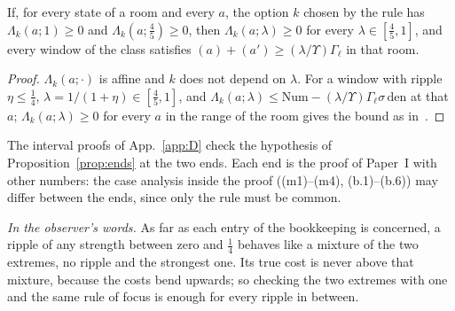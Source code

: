 \begin{proposition} \proofst
\label{prop:ends}
If, for every state of a room and every $a$, the option $k$ chosen by the rule has $\Lambda_k(a;1)\ge0$ and $\Lambda_k(a;\tfrac45)\ge0$, then $\Lambda_k(a;\lambda)\ge0$ for every $\lambda\in[\tfrac45,1]$, and every window of the class satisfies $(a)+(a')\ge(\lambda/\Upsilon)\Gamma_\ell$ in that room.
\end{proposition}

\begin{proof}
$\Lambda_k(a;\cdot)$ is affine and $k$ does not depend on $\lambda$.
For a window with ripple $\eta\le\tfrac14$, $\lambda=1/(1+\eta)\in[\tfrac45,1]$, and $\Lambda_k(a;\lambda)\le\mathrm{Num}-(\lambda/\Upsilon)\Gamma_\ell\sigma\,\mathrm{den}$ at that $a$; $\Lambda_k(a;\lambda)\ge0$ for every $a$ in the range of the room gives the bound as in~\cite{I}.
\end{proof}

The interval proofs of App.~\ref{app:D} check the hypothesis of Proposition~\ref{prop:ends} at the two ends.
Each end is the proof of Paper~I with other numbers: the case analysis inside the proof ((m1)--(m4), (b.1)--(b.6)) may differ between the ends, since only the rule must be common.

\emph{In the observer's words.}
As far as each entry of the bookkeeping is concerned, a ripple of any strength between zero and $\tfrac14$ behaves like a mixture of the two extremes, no ripple and the strongest one.
Its true cost is never above that mixture, because the costs bend upwards; so checking the two extremes with one and the same rule of focus is enough for every ripple in between.
